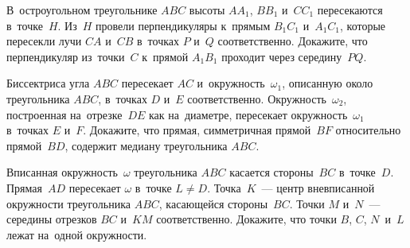 \begin{problems}
\item
В~остроугольном треугольнике $ABC$ высоты $AA_{1}$, $BB_{1}$ и~$CC_{1}$
пересекаются в~точке~$H$.
Из~$H$ провели перпендикуляры к~прямым $B_{1}C_{1}$ и~$A_{1}C_{1}$, которые
пересекли лучи $CA$ и~$CB$ в~точках $P$ и~$Q$ соответственно.
Докажите, что перпендикуляр из~точки~$C$ к~прямой $A_{1}B_{1}$ проходит через
середину~$PQ$.

\item
Биссектриса угла $ABC$ пересекает $AC$ и~окружность~$\omega_{1}$, описанную
около треугольника $ABC$, в~точках $D$ и~$E$ соответственно.
Окружность~$\omega_{2}$, построенная на~отрезке~$DE$ как на~диаметре,
пересекает окружность~$\omega_{1}$ в~точках $E$ и~$F$.
Докажите, что прямая, симметричная прямой~$BF$ относительно прямой~$BD$,
содержит медиану треугольника $ABC$.


\item
Вписанная окружность~$\omega$ треугольника $ABC$ касается стороны~$BC$
в~точке~$D$.
Прямая~$AD$ пересекает $\omega$ в~точке $L \neq D$.
Точка~$K$~--- центр вневписанной окружности треугольника $ABC$, касающейся
стороны~$BC$.
Точки $M$ и~$N$~--- середины отрезков $BC$ и~$KM$ соответственно.
Докажите, что точки $B$, $C$, $N$~и~$L$ лежат на~одной окружности.

\end{problems}

